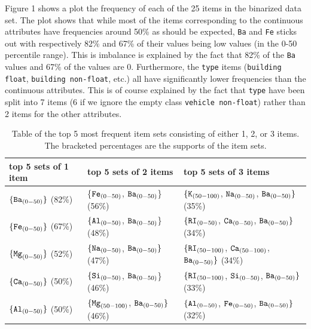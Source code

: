 Figure 1 shows a plot the frequency of each of the 25 items in the binarized data set. The plot shows that while most of the items corresponding to the continuous attributes have frequencies around 50\% as should be expected, \texttt{Ba} and \texttt{Fe} sticks out with respectively 82\% and 67\% of their values being low values (in the 0-50 percentile range). This is imbalance is explained by the fact that 82\% of the \texttt{Ba} values and 67\% of the  values are 0. Furthermore, the \texttt{type} items (\texttt{building float}, \texttt{building non-float}, etc.) all have significantly lower frequencies than the continuous attributes. This is of course explained by the fact that \texttt{type} have been split into 7 items (6 if we ignore the empty class \texttt{vehicle non-float}) rather than 2 items for the other attributes.

\begin{table}[H]
    \centering
    \begin{tabular}{l|l|l}
        top 5 sets of 1 item  & top 5 sets of 2 items   & top 5 sets of 3 items \\ \hline
            $\{\texttt{Ba}_{(0-50)}\}$ (82\%) 
        &   \{$\texttt{Fe}_{(0-50)}$, $\texttt{Ba}_{(0-50)}$\} (56\%)
        &   $\{ \texttt{K}_{(50-100)}$, $\texttt{Na}_{(0-50)}$, $\texttt{Ba}_{(0-50)}\}$ (35\%)\\  
            $\{\texttt{Fe}_{(0-50)}\}$ (67\%) 
        &   $\{\texttt{Al}_{(0-50)}$, $\texttt{Ba}_{(0-50)}$\} (48\%) 
        &   $\{\texttt{RI}_{(0-50)}$, $\texttt{Ca}_{(0-50)}$, $\texttt{Ba}_{(0-50)}\}$ (34\%)\\
            $\{\texttt{Mg}_{(0-50)}\}$ (52\%)
        &   $\{\texttt{Na}_{(0-50)}$, $\texttt{Ba}_{(0-50)}\}$ (47\%) 
        &   $\{ \texttt{RI}_{(50-100)}$, $\texttt{Ca}_{(50-100)}$, $\texttt{Ba}_{(0-50)}\}$ (34\%)\\
            $\{\texttt{Ca}_{(0-50)}\}$ (50\%) 
        &   $\{\texttt{Si}_{(0-50)}$, $\texttt{Ba}_{(0-50)}$\} (46\%) 
        &   $\{ \texttt{RI}_{(50-100)}$, $\texttt{Si}_{(0-50)}$, $\texttt{Ba}_{(0-50)}\}$  (33\%)  \\
            $\{\texttt{Al}_{(0-50)}\}$ (50\%) 
        &   $\{\texttt{Mg}_{(50-100)}$, $\texttt{Ba}_{(0-50)}\}$ (46\%) 
        &   $\{ \texttt{Al}_{(0-50)}$, $\texttt{Fe}_{(0-50)}$, $\texttt{Ba}_{(0-50)}\}$ (32\%) \\
    \end{tabular}
    \caption{Table of the top 5 most frequent item sets consisting of either 1, 2, or 3 items. The bracketed percentages are the supports of the item sets.}
    \label{tab:freq-items}
\end{table}

